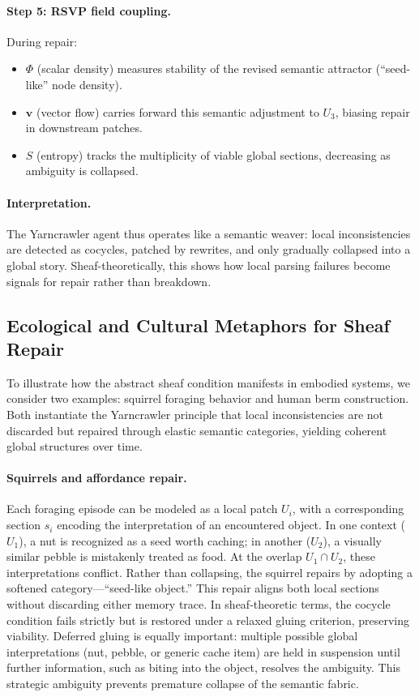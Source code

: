 \documentclass{article}
\begin{document}
\paragraph{Step 5: RSVP field coupling.}
During repair:
\begin{itemize}
    \item $\Phi$ (scalar density) measures stability of the revised semantic attractor (“seed-like” node density).
    \item $\mathbf{v}$ (vector flow) carries forward this semantic adjustment to $U_3$, biasing repair in downstream patches.
    \item $S$ (entropy) tracks the multiplicity of viable global sections, decreasing as ambiguity is collapsed.
\end{itemize}

\paragraph{Interpretation.}
The Yarncrawler agent thus operates like a semantic weaver: local inconsistencies are detected as cocycles, patched by rewrites, and only gradually collapsed into a global story. Sheaf-theoretically, this shows how local parsing failures become signals for repair rather than breakdown.

\subsection{Ecological and Cultural Metaphors for Sheaf Repair}

To illustrate how the abstract sheaf condition manifests in embodied systems, we consider two examples: squirrel foraging behavior and human berm construction. Both instantiate the Yarncrawler principle that local inconsistencies are not discarded but repaired through elastic semantic categories, yielding coherent global structures over time.

\paragraph{Squirrels and affordance repair.}
Each foraging episode can be modeled as a local patch $U_i$, with a corresponding section $s_i$ encoding the interpretation of an encountered object. In one context ($U_1$), a nut is recognized as a seed worth caching; in another ($U_2$), a visually similar pebble is mistakenly treated as food. At the overlap $U_1 \cap U_2$, these interpretations conflict. Rather than collapsing, the squirrel repairs by adopting a softened category---``seed-like object.'' This repair aligns both local sections without discarding either memory trace. In sheaf-theoretic terms, the cocycle condition fails strictly but is restored under a relaxed gluing criterion, preserving viability. Deferred gluing is equally important: multiple possible global interpretations (nut, pebble, or generic cache item) are held in suspension until further information, such as biting into the object, resolves the ambiguity. This strategic ambiguity prevents premature collapse of the semantic fabric.
\end{document}
